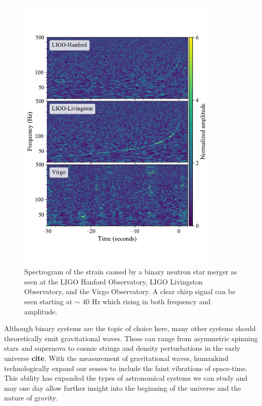 \documentclass [12pt, proquest]{uwthesis}[2019]
\begin{document}
\begin{figure}%
\begin{center}
\includegraphics[width=0.85\textwidth]{GW170817.pdf}
\caption{Spectrogram of the strain caused by a binary neutron star merger as seen at the LIGO Hanford Observatory, LIGO Livingston Observatory, and the Virgo Observatory. \cite{GW170817} A clear chirp signal can be seen starting at $\sim$ 40 Hz which rising in both frequency and amplitude.}
\label{GW170817}
\end{center}
\end{figure}
 
 Although binary systems are the topic of choice here, many other systems should theoretically emit gravitational waves. These can range from asymmetric spinning stars and supernova to cosmic strings and density perturbations in the early universe \textbf{cite}. With the measurement of gravitational waves, humankind technologically expand our senses to include the faint vibrations of space-time. This ability has expanded the types of astronomical systems we can study and may one day allow further insight into the beginning of the universe and the nature of gravity.
\end{document}
